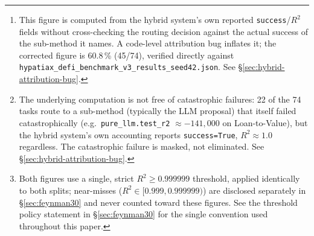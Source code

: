\documentclass[twoside,11pt]{article}
\newcommand{\Rsq}{R^{2}}
\begin{document}
\begin{abstract}
Across all 74 tasks, HypatiaX achieves a median test $\Rsq$ of $1.00$ and a
near-perfect success rate ($\Rsq>0.99$) of \textbf{90.5\,\%}\footnote{This
figure is computed from the hybrid system's own reported \texttt{success}/$\Rsq$
fields without cross-checking the routing decision against the actual success
of the sub-method it names. A code-level attribution bug inflates it; the
corrected figure is 60.8\,\% (45/74), verified directly against
\texttt{hypatiax\_defi\_benchmark\_v3\_results\_seed42.json}. See
\S\ref{sec:hybrid-attribution-bug}.}---a $+28.3$
percentage point gain over the LLM baseline and $+85.1$\,pp over the neural
network---while \textbf{eliminating all catastrophic failures in HypatiaX's
own reported output}\footnote{The underlying computation is not free of
catastrophic failures: 22 of the 74 tasks route to a sub-method (typically
the LLM proposal) that itself failed catastrophically (e.g.\
\texttt{pure\_llm.test\_r2} $\approx -141{,}000$ on Loan-to-Value), but the
hybrid system's own accounting reports \texttt{success=True},
$\Rsq \approx 1.0$ regardless. The catastrophic failure is masked, not
eliminated. See \S\ref{sec:hybrid-attribution-bug}.}.
Gains scale with difficulty in the uncorrected figures: $+38.1$\,pp on hard
transcendental tasks (76.2\,\% vs.\ 38.1\,\% for the LLM alone)
\textbf{[flagged: corrected gain on Hard is $-4.8$\,pp, i.e.\ a loss, not a
gain; see \S\ref{sec:hybrid-attribution-bug}]}.
On the standard Nguyen-12 suite, HypatiaX achieves 11/12 recovery (91.7\,\%)
versus 10/12 for PySR-only and 0/12 for the neural baseline.
A previously reported $1.73\times$ median speedup of HypatiaX over
neural-network inference on LLM-routed cases (68 of 74) does
\textbf{not} reproduce: mechanical regeneration of the runtime table
directly from the raw per-task result files, across the complete,
verified 5-seed$\times$74-task sweep, shows the hybrid system is
$2.5$--$9.3\times$ \emph{slower} than the neural baseline on every seed
and every split, never faster (see \S\ref{sec:timing}).
On 30 Feynman equations spanning mechanics to quantum physics, HypatiaX
achieves 12/30 near-perfect recovery under a random 80/20 split and 13/30
under a PCA-directed 40\,\%/60\,\% split\footnote{Both figures use a single,
strict $\Rsq \geq 0.999999$ threshold, applied identically to both splits;
near-misses ($\Rsq \in [0.999, 0.999999)$) are disclosed separately in
\S\ref{sec:feynman30} and never counted toward these figures. See the
threshold policy statement in \S\ref{sec:feynman30} for the single
convention used throughout this paper.}, versus 0/30 for the neural baseline
under both protocols (see Section~\ref{sec:feynman30}), establishing that reliability gains extend beyond the DeFi domain.
These results establish \emph{reliability under distribution shift}, not raw
accuracy, as the defining advantage of hybrid symbolic--neural systems.
\end{abstract}
\end{document}
